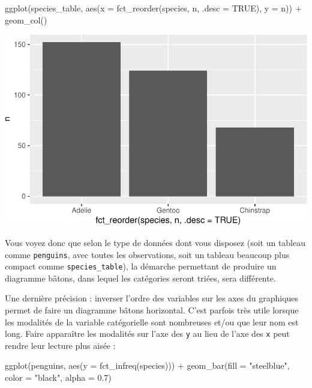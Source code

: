 \documentclass[
  a4paper,
  DIV=11,
  numbers=noendperiod,
  oneside]{scrreprt}
\newenvironment{Shaded}{}{}
\newcommand{\AttributeTok}[1]{\textcolor[rgb]{0.84,0.23,0.29}{#1}}
\newcommand{\ConstantTok}[1]{\textcolor[rgb]{0.00,0.36,0.77}{#1}}
\newcommand{\FloatTok}[1]{\textcolor[rgb]{0.00,0.36,0.77}{#1}}
\newcommand{\FunctionTok}[1]{\textcolor[rgb]{0.44,0.26,0.76}{#1}}
\newcommand{\NormalTok}[1]{\textcolor[rgb]{0.14,0.16,0.18}{#1}}
\newcommand{\SpecialCharTok}[1]{\textcolor[rgb]{0.00,0.36,0.77}{#1}}
\newcommand{\StringTok}[1]{\textcolor[rgb]{0.01,0.18,0.38}{#1}}
\begin{document}
\begin{Shaded}
\begin{Highlighting}[]
\FunctionTok{ggplot}\NormalTok{(species\_table, }
       \FunctionTok{aes}\NormalTok{(}\AttributeTok{x =} \FunctionTok{fct\_reorder}\NormalTok{(species, n, }\AttributeTok{.desc =} \ConstantTok{TRUE}\NormalTok{), }\AttributeTok{y =}\NormalTok{ n)) }\SpecialCharTok{+}
  \FunctionTok{geom\_col}\NormalTok{()}
\end{Highlighting}
\end{Shaded}

\includegraphics{03-visualization_files/figure-pdf/unnamed-chunk-43-1.pdf}

Vous voyez donc que selon le type de données dont vous disposez (soit un
tableau comme \texttt{penguins}, avec toutes les observations, soit un
tableau beaucoup plus compact comme \texttt{species\_table}), la
démarche permettant de produire un diagramme bâtons, dans lequel les
catégories seront triées, sera différente.

Une dernière précision : inverser l'ordre des variables sur les axes du
graphiques permet de faire un diagramme bâtons horizontal. C'est parfois
très utile lorsque les modalités de la variable catégorielle sont
nombreuses et/ou que leur nom est long. Faire apparaître les modalités
sur l'axe des \texttt{y} au lieu de l'axe des \texttt{x} peut rendre
leur lecture plus aisée :

\begin{Shaded}
\begin{Highlighting}[]
\FunctionTok{ggplot}\NormalTok{(penguins, }\FunctionTok{aes}\NormalTok{(}\AttributeTok{y =} \FunctionTok{fct\_infreq}\NormalTok{(species))) }\SpecialCharTok{+}
  \FunctionTok{geom\_bar}\NormalTok{(}\AttributeTok{fill =} \StringTok{"steelblue"}\NormalTok{, }\AttributeTok{color =} \StringTok{"black"}\NormalTok{, }\AttributeTok{alpha =} \FloatTok{0.7}\NormalTok{)}
\end{Highlighting}
\end{Shaded}
\end{document}
